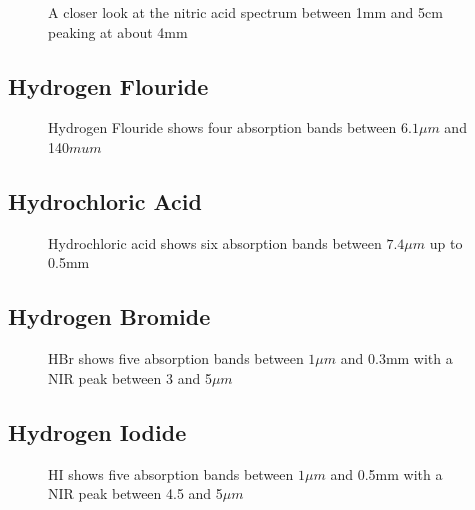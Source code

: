 \documentclass[12pt]{article}
\begin{document}
\vspace*{11.5cm}
\begin{figure}[htb]
\caption{A closer look at the nitric acid spectrum between  1mm  and 5cm peaking at about 4mm}
\end{figure}
\newpage


\subsection{Hydrogen Flouride}

\vspace*{11.5cm}
\begin{figure}[htb]
\caption{Hydrogen Flouride shows four absorption bands between  $6.1 \mu m$
 and 140$mu m$}
\end{figure}
\newpage


\subsection{Hydrochloric Acid}

\vspace*{11.5cm}
\begin{figure}[htb]
\caption{Hydrochloric acid shows six absorption bands between  $7.4 \mu m$
 up to 0.5mm}
\end{figure}
\newpage

\subsection{Hydrogen Bromide}

\vspace*{11.5cm}
\begin{figure}[htb]
\caption{HBr shows five absorption bands between  $1\mu m$
 and  0.3mm with a NIR peak between 3 and 5$\mu m$}
\end{figure}
\newpage


\subsection{Hydrogen Iodide}

\vspace*{11.5cm}
\begin{figure}[htb]
\caption{HI shows five absorption bands between  $1\mu m$
 and  0.5mm with a NIR peak between 4.5 and 5$\mu m$}
\end{figure}
\newpage
\end{document}
